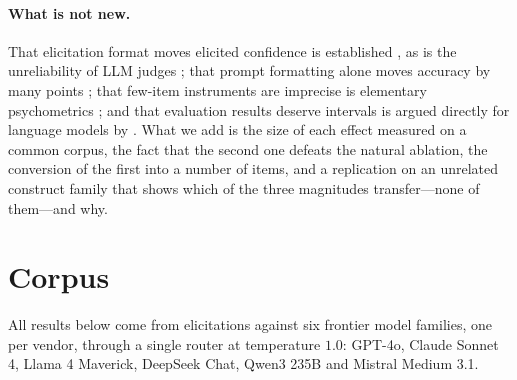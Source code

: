 \documentclass[11pt,letterpaper]{article}
\begin{document}
\paragraph{What is not new.} That elicitation format moves elicited confidence is established
\citep{protocolsens2026}, as is the unreliability of LLM judges \citep{coinflip2026}; that
prompt formatting alone moves accuracy by many points \citep{sclar2024quantifying}; that
few-item instruments are imprecise is elementary psychometrics \citep{cronbach1972}; and that evaluation results deserve intervals is argued directly for
language models by \citet{miller2024errorbars}. What we
add is the size of each effect measured on a common corpus, the fact that the second one
defeats the natural ablation, the conversion of the first into a number of items, and a
replication on an unrelated construct family that shows which of the three magnitudes
transfer---none of them---and why.

\section{Corpus}
\label{sec:corpus}

All results below come from elicitations against six frontier model families, one per vendor,
through a single router at temperature $1.0$: GPT-4o, Claude Sonnet 4, Llama 4 Maverick,
DeepSeek Chat, Qwen3 235B and Mistral Medium 3.1.
\end{document}
